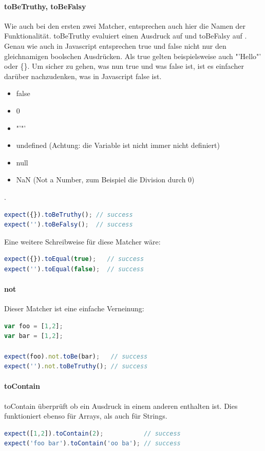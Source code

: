 {\paragraph{toBeTruthy, toBeFalsy}
Wie auch bei den ersten zwei Matcher, entsprechen auch hier die Namen der Funktionalität. toBeTruthy evaluiert einen Ausdruck auf  und toBeFalsy auf . Genau wie auch in Javascript entsprechen true und false nicht nur den gleichnamigen boolschen Ausdrücken. Als true gelten beispielsweise auch "'Hello"' oder \{\}. Um sicher zu gehen, was nun true und was false ist, ist es einfacher darüber nachzudenken, was in Javascript false ist.
\begin{itemize}
  \item false
  \item 0
  \item "'"'
  \item undefined (Achtung: die Variable  ist nicht immer nicht definiert)
  \item null
  \item NaN (Not a Number, zum Beispiel die Division durch 0)
\end{itemize}
 \autocite[17]{Hahn:2013}.
\begin{lstlisting}[language=JavaScript]
expect({}).toBeTruthy(); // success
expect('').toBeFalsy();  // success
\end{lstlisting}
Eine weitere Schreibweise für diese Matcher wäre:
\begin{lstlisting}[language=JavaScript]
expect({}).toEqual(true);   // success
expect('').toEqual(false);  // success
\end{lstlisting}

\paragraph{not}
Dieser Matcher ist eine einfache Verneinung:
\begin{lstlisting}[language=JavaScript]
var foo = [1,2];
var bar = [1,2];

expect(foo).not.toBe(bar);   // success
expect('').not.toBeTruthy(); // success
\end{lstlisting}

\paragraph{toContain}
toContain überprüft ob ein Ausdruck in einem anderen enthalten ist. Dies funktioniert ebenso für Arrays, als auch für Strings.
\begin{lstlisting}[language=JavaScript]
expect([1,2]).toContain(2);           // success
expect('foo bar').toContain('oo ba'); // success
\end{lstlisting}

}
